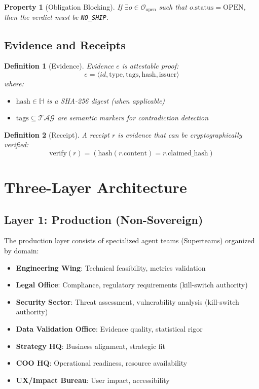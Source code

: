 \documentclass[11pt, letterpaper]{article}
\newtheorem{definition}{Definition}
\newtheorem{property}{Property}
\begin{document}
\begin{property}[Obligation Blocking]
If $\exists o \in \mathcal{O}_{\text{open}}$ such that $o.\text{status} = \text{OPEN}$, then the verdict must be \texttt{NO\_SHIP}.
\end{property}

\subsection{Evidence and Receipts}

\begin{definition}[Evidence]
Evidence $e$ is attestable proof:
\[
e = \langle id, \text{type}, \text{tags}, \text{hash}, \text{issuer} \rangle
\]
where:
\begin{itemize}
    \item $\text{hash} \in \mathbb{H}$ is a SHA-256 digest (when applicable)
    \item $\text{tags} \subseteq \mathcal{TAG}$ are semantic markers for contradiction detection
\end{itemize}
\end{definition}

\begin{definition}[Receipt]
A receipt $r$ is evidence that can be cryptographically verified:
\[
\text{verify}(r) = (\text{hash}(r.\text{content}) = r.\text{claimed\_hash})
\]
\end{definition}

\section{Three-Layer Architecture}

\subsection{Layer 1: Production (Non-Sovereign)}

The production layer consists of specialized agent teams (Superteams) organized by domain:

\begin{itemize}
    \item \textbf{Engineering Wing}: Technical feasibility, metrics validation
    \item \textbf{Legal Office}: Compliance, regulatory requirements (kill-switch authority)
    \item \textbf{Security Sector}: Threat assessment, vulnerability analysis (kill-switch authority)
    \item \textbf{Data Validation Office}: Evidence quality, statistical rigor
    \item \textbf{Strategy HQ}: Business alignment, strategic fit
    \item \textbf{COO HQ}: Operational readiness, resource availability
    \item \textbf{UX/Impact Bureau}: User impact, accessibility
\end{itemize}
\end{document}
